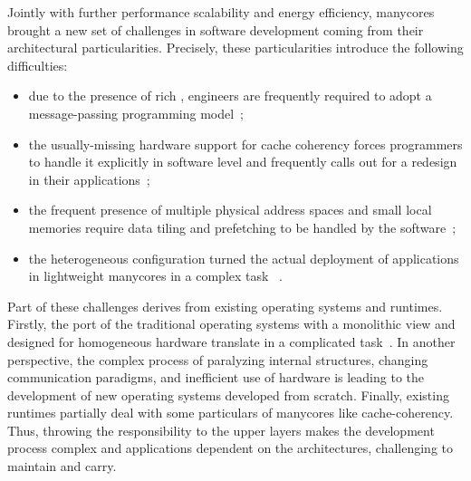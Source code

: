     Jointly with further performance scalability and energy efficiency, manycores brought a new set of challenges in software development coming from their architectural particularities.
    Precisely, these particularities introduce the following difficulties:
    \begin{itemize}
        \item due to the presence of rich \nocs, engineers are frequently required to adopt a message-passing programming model~\cite{Kelly2013};
        \item the usually-missing hardware support for cache coherency forces programmers to handle it explicitly in software level and frequently calls out for a redesign in their applications~\cite{Francesquini2015};
        \item the frequent presence of multiple physical address spaces and small local memories require data tiling and prefetching to be handled by the software~\cite{Castro2016};
        \item the heterogeneous configuration turned the actual deployment of applications in lightweight manycores in a complex task ~\cite{Barbalace2015}.
    \end{itemize}

    Part of these challenges derives from existing operating systems and runtimes.
    Firstly, the port of the traditional operating systems with a monolithic view and designed for homogeneous hardware translate in a complicated task~\cite{multikernel}.
    In another perspective, the complex process of paralyzing internal structures, changing communication paradigms, and inefficient use of hardware is leading to the development of new operating systems developed from scratch.
    Finally, existing runtimes partially deal with some particulars of manycores like cache-coherency.
    Thus, throwing the responsibility to the upper layers makes the development process complex and applications dependent on the architectures, challenging to maintain and carry.

